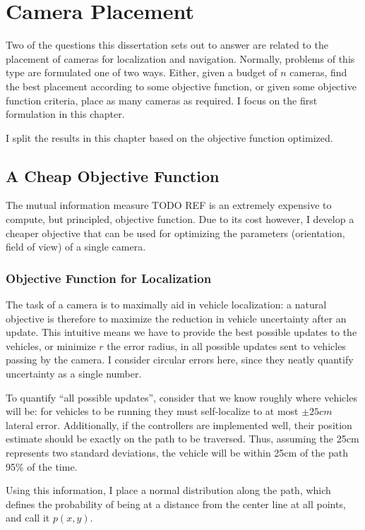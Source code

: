 \documentclass[a4paper,12pt,twoside,openright]{report}
\begin{document}
\chapter{Camera Placement}
\label{chap:cameraplacement}

Two of the questions this dissertation sets out to answer
are related to the placement of cameras for localization and navigation.
Normally, problems of this type are formulated one of two ways. Either,
given a budget of $n$ cameras, find the best placement according to
some objective function, or given some objective function criteria,
place as many cameras as required. I focus on the first formulation
in this chapter.

I split the results in this chapter based on the objective
function optimized.

\section{A Cheap Objective Function}

The mutual information measure TODO REF is an extremely expensive to compute,
but principled, objective function. Due to its cost however, I
develop a cheaper objective that can be used for optimizing
the parameters (orientation, field of view) of a single camera.


\subsection{Objective Function for Localization}

The task of a camera is to maximally aid in vehicle localization: a natural
objective is therefore to maximize the reduction in vehicle uncertainty
after an update. This intuitive means we have to provide the best possible
updates to the vehicles, or minimize $r$ the error radius, in all possible updates sent to vehicles
passing by the camera. I consider circular errors here,
since they neatly quantify uncertainty as a single number.

To quantify ``all possible updates'', consider that we know roughly where vehicles will be: 
for vehicles to be running they must self-localize to at most $\pm25cm$ lateral error. 
Additionally, if the controllers are implemented well, their position estimate should be exactly on the path
to be traversed. Thus, assuming the 25cm represents two standard deviations,
the vehicle will be within 25cm of the path 95\% of the time.

Using this information, I place a normal distribution
along the path, which defines the probability of being at a distance
from the center line at all points, and call it $p(x,y)$.
\end{document}

